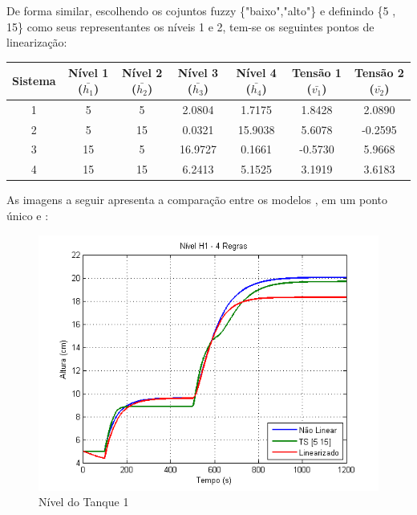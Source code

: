 De forma similar, escolhendo os cojuntos fuzzy \{"baixo","alto"\} e definindo \{5 , 15\} como seus representantes os níveis 1 e 2, tem-se os seguintes pontos de linearização:
\begin{center}
	\begin{tabular}{|c|c|c|c|c|c|c|}
		\hline
		Sistema & Nível 1 ($\bar{h_1}$) & Nível 2 ($\bar{h_2}$) & Nível 3 ($\bar{h_3}$) & Nível 4 ($\bar{h_4}$) & Tensão 1 ($\bar{v_1}$) & Tensão 2 ($\bar{v_2}$) \\ \hline
		1 & 5 & 5 & 2.0804 & 1.7175 & 1.8428 & 2.0890 \\ \hline
		2 & 5 & 15 & 0.0321 & 15.9038 & 5.6078 & -0.2595 \\ \hline
		3 & 15 & 5 & 16.9727 & 0.1661 & -0.5730 & 5.9668 \\ \hline
		4 & 15 & 15 & 6.2413 & 5.1525 & 3.1919 & 3.6183 \\	\hline
	\end{tabular}
\end{center}

As imagens a seguir apresenta a comparação entre os modelos ,  em um ponto único e :

\begin{figure}[H]
	\centering
	\includegraphics[width=\textwidth]{img/h1_ts2_nm.png}
	\caption{\small Nível do Tanque 1}
	\label{figH1TS2_nm}
\end{figure}


